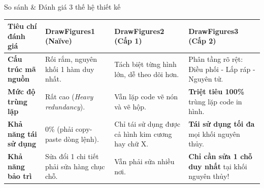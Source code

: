 \documentclass[aspectratio=169, 10pt]{beamer}
\begin{document}
\begin{frame}{So sánh \& Đánh giá 3 thế hệ thiết kế}
  \centering
  \small
  \begin{tabularx}{0.96\textwidth}{l X X X}
    \toprule
    \textbf{Tiêu chí đánh giá} & \textbf{DrawFigures1 (Naïve)} & \textbf{DrawFigures2 (Cấp 1)} & \textbf{DrawFigures3 (Cấp 2)} \\
    \midrule
    \textbf{Cấu trúc mã nguồn} & Rối rắm, nguyên khối 1 hàm duy nhất. & Tách biệt từng hình lớn, dễ theo dõi hơn. & Phân tầng rõ rệt: Điều phối - Lắp ráp - Nguyên tử. \\
    \addlinespace
    \textbf{Mức độ trùng lặp} & Rất cao (\textit{Heavy redundancy}). & Vẫn lặp code vẽ nón và vẽ hộp. & \textbf{Triệt tiêu 100\%} trùng lặp code in hình. \\
    \addlinespace
    \textbf{Khả năng tái sử dụng} & 0\% (phải copy-paste dòng lệnh). & Chỉ tái sử dụng được cả hình kim cương hay chữ X. & \textbf{Tái sử dụng tối đa} mọi khối nguyên thủy. \\
    \addlinespace
    \textbf{Khả năng bảo trì} & Sửa đổi 1 chi tiết phải sửa hàng chục chỗ. & Vẫn phải sửa nhiều nơi. & \textbf{Chỉ cần sửa 1 chỗ duy nhất} tại khối nguyên thủy! \\
    \bottomrule
  \end{tabularx}
\end{frame}
\end{document}
